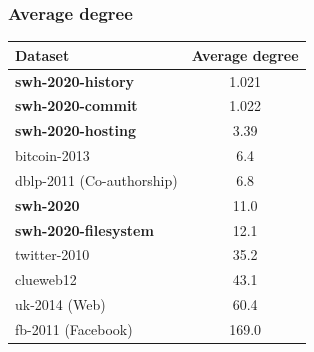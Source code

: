 \documentclass[aspectratio=169,xcolor=table]{beamer}
\begin{document}
    \begin{frame}
        \frametitle{Average degree}

        \begin{table}
            \centering
            \begin{tabular}[t]{l S[table-format=3.3]}
                \textbf{Dataset} & \textbf{Average degree} \\
                \hline
                \textbf{swh-2020-history}    & 1.021 \\
                \textbf{swh-2020-commit}     & 1.022 \\
                \textbf{swh-2020-hosting}    & 3.39 \\
                bitcoin-2013 & 6.4 \\
                dblp-2011 (Co-authorship)       & 6.8 \\
                \textbf{swh-2020}            & 11.0 \\
                \textbf{swh-2020-filesystem} & 12.1 \\
                twitter-2010      & 35.2 \\
                clueweb12                    & 43.1 \\
                uk-2014 (Web)               & 60.4 \\
                fb-2011 (Facebook)          & 169.0 \\
            \end{tabular}
        \end{table}
    \end{frame}
\end{document}
